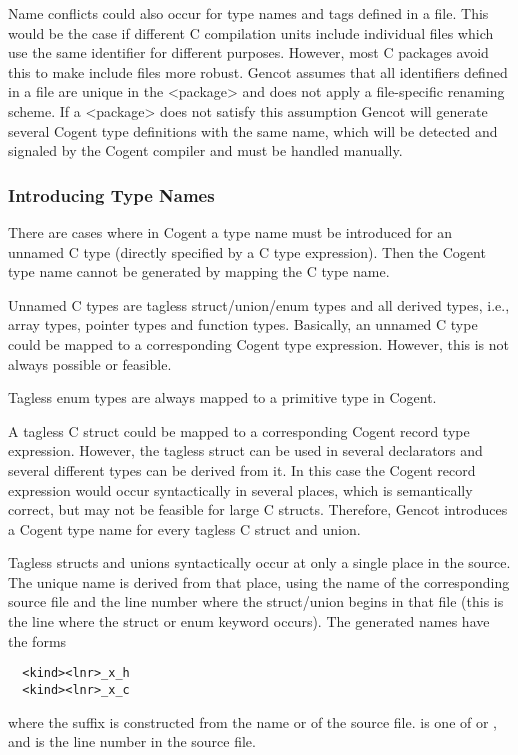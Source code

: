 Name conflicts could also occur for type names and tags defined in a  file. This would be the case if different
C compilation units include individual  files which use the same identifier for different purposes. However, most
C packages avoid this to make include files more robust. Gencot assumes that all identifiers defined in a  file
are unique in the <package> and does not apply a file-specific renaming scheme. If a <package> does not satisfy this assumption
Gencot will generate several Cogent type definitions with the same name, which will be detected and signaled by the Cogent 
compiler and must be handled manually.

\subsubsection{Introducing Type Names}

There are cases where in Cogent a type name must be introduced for an unnamed C type (directly specified by a C type 
expression). Then the Cogent type name cannot be generated by mapping the C type name.

Unnamed C types are tagless struct/union/enum types and all derived types, i.e., array types, pointer types and 
function types. Basically, an unnamed C type could be mapped to a corresponding Cogent type expression. However,
this is not always possible or feasible.

Tagless enum types are always mapped to a primitive type in Cogent.

A tagless C struct could be mapped to a corresponding Cogent record type expression. However, the tagless struct
can be used in several declarators and several different types can be derived from it. In this case the Cogent record
expression would occur syntactically in several places, which is semantically correct, but may not be feasible for
large C structs. Therefore, Gencot introduces a Cogent type name for every tagless C struct and union.

Tagless structs and unions syntactically occur at only a single place in the source. The unique name is derived from 
that place, using the name of the corresponding source file and the line number where the struct/union begins
in that file (this is the line where the struct or enum keyword occurs).
The generated names have the forms
\begin{verbatim}
  <kind><lnr>_x_h
  <kind><lnr>_x_c
\end{verbatim}
where the suffix is constructed from the name  or  of the source file.  is one of
 or , and  is the line number in the source file.

